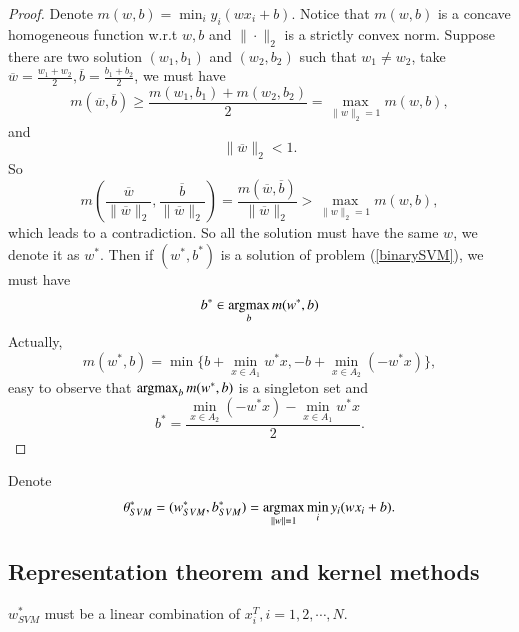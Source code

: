 \begin{proof}
	Denote $m(w,b) = \min_{i} y_i(wx_i+b)$. Notice that $m(w,b)$ is a concave homogeneous function w.r.t $w,b$ and $\|\cdot\|_2$ is a strictly convex norm. Suppose there are two solution $(w_1,b_1)$ and $(w_2,b_2)$ such that $w_1 \neq w_2$, take $\overline{w} = \frac{w_1 + w_2}{2}, \overline{b} = \frac{b_1 + b_2}{2}$, we must have
	\begin{equation}
		m(\overline{w},\overline{b}) \geq \frac{m(w_1,b_1)+ m(w_2,b_2)}{2} = \max_{\|w\|_2 = 1} m(w,b),
	\end{equation}
	and 
	\begin{equation}
		\|\overline{w}\|_2 < 1.
	\end{equation}
	So
	\begin{equation}
		m(\frac{\overline{w}}{\|\overline{w}\|_2},\frac{\overline{b}}{\|\overline{w}\|_2}) = \frac{m(\overline{w},\overline{b}) }{\|\overline{w}\|_2} > \max_{\|w\|_2 = 1} m(w,b),
	\end{equation}
	which leads to a contradiction. So all the solution must have the same $w$, we denote it as $w^*$. Then if $(w^*,b^*)$ is a solution of problem (\ref{binarySVM}), we must have
	\begin{equation}
		b^* \in \mathop{\rm argmax}_{b} m(w^*,b)
	\end{equation}
	Actually,
	\begin{equation}
		m(w^*,b) = \min\{b+\min_{x\in A_1} w^*x, -b +\min_{x\in A_2} (-w^*x)\},
	\end{equation}
	easy to observe that $\mathop{\rm argmax}_{b} m(w^*,b)$ is a singleton set and 
	\begin{equation}
		b^* = \frac{\min_{x\in A_2} (-w^*x) - \min_{x\in A_1} w^*x}{2}.
	\end{equation}
\end{proof}

Denote
\begin{equation}
	\theta^*_{SVM} = (w_{SVM}^*,b_{SVM}^*) = \mathop{\rm argmax}_{\|w\| = 1} \min_{i} y_i(wx_i+b).
\end{equation}


\subsection{Representation theorem and kernel methods}

\begin{theorem}
	$w_{SVM}^*$ must be a linear combination of $x_i^T, i = 1,2,\cdots,N$.
\end{theorem}

